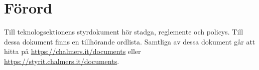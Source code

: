 \section*{Förord}
Till teknologsektionens styrdokument hör stadga, reglemente och policys. Till dessa dokument finns en tillhörande ordlista. Samtliga av dessa dokument går att hitta på \url{https://chalmers.it/documents} eller \url{https://styrit.chalmers.it/documents}. 